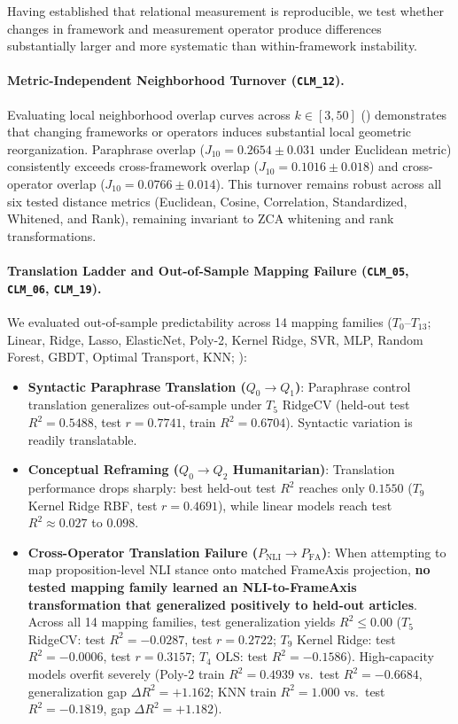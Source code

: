 Having established that relational measurement is reproducible, we test whether changes in framework and measurement operator produce differences substantially larger and more systematic than within-framework instability.

\paragraph{Metric-Independent Neighborhood Turnover (\texttt{CLM\_12}).}
Evaluating local neighborhood overlap curves across $k \in [3, 50]$ () demonstrates that changing frameworks or operators induces substantial local geometric reorganization. Paraphrase overlap ($J_{10} = 0.2654 \pm 0.031$ under Euclidean metric) consistently exceeds cross-framework overlap ($J_{10} = 0.1016 \pm 0.018$) and cross-operator overlap ($J_{10} = 0.0766 \pm 0.014$). This turnover remains robust across all six tested distance metrics (Euclidean, Cosine, Correlation, Standardized, Whitened, and Rank), remaining invariant to ZCA whitening and rank transformations.

\paragraph{Translation Ladder and Out-of-Sample Mapping Failure (\texttt{CLM\_05}, \texttt{CLM\_06}, \texttt{CLM\_19}).}
We evaluated out-of-sample predictability across 14 mapping families ($T_0$--$T_{13}$; Linear, Ridge, Lasso, ElasticNet, Poly-2, Kernel Ridge, SVR, MLP, Random Forest, GBDT, Optimal Transport, KNN; ):
\begin{itemize}
    \item \textbf{Syntactic Paraphrase Translation ($Q_0 \to Q_1$)}: Paraphrase control translation generalizes out-of-sample under $T_5$ RidgeCV (held-out test $R^2 = \mathbf{0.5488}$, test $r = 0.7741$, train $R^2 = 0.6704$). Syntactic variation is readily translatable.
    \item \textbf{Conceptual Reframing ($Q_0 \to Q_2$ Humanitarian)}: Translation performance drops sharply: best held-out test $R^2$ reaches only $\mathbf{0.1550}$ ($T_9$ Kernel Ridge RBF, test $r = 0.4691$), while linear models reach test $R^2 \approx 0.027$ to $0.098$.
    \item \textbf{Cross-Operator Translation Failure ($P_{\text{NLI}} \to P_{\text{FA}}$)}: When attempting to map proposition-level NLI stance onto matched FrameAxis projection, \textbf{no tested mapping family learned an NLI-to-FrameAxis transformation that generalized positively to held-out articles}. Across all 14 mapping families, test generalization yields $R^2 \le 0.00$ ($T_5$ RidgeCV: test $R^2 = \mathbf{-0.0287}$, test $r = 0.2722$; $T_9$ Kernel Ridge: test $R^2 = \mathbf{-0.0006}$, test $r = 0.3157$; $T_4$ OLS: test $R^2 = -0.1586$). High-capacity models overfit severely (Poly-2 train $R^2 = 0.4939$ vs.\ test $R^2 = -0.6684$, generalization gap $\Delta R^2 = +1.162$; KNN train $R^2 = 1.000$ vs.\ test $R^2 = -0.1819$, gap $\Delta R^2 = +1.182$).
\end{itemize}

